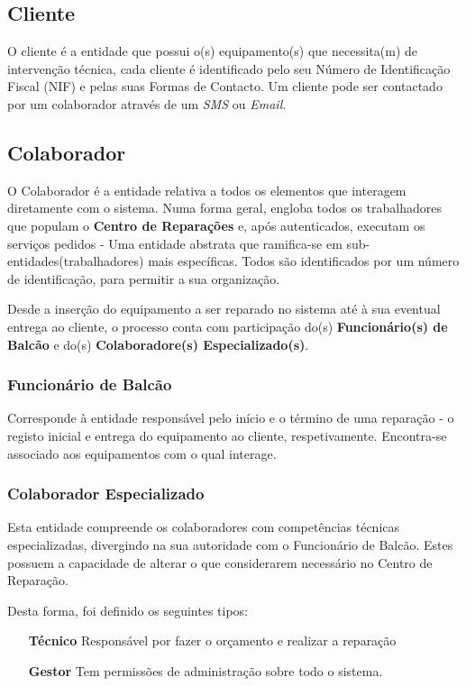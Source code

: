 \documentclass[a4paper,12pt]{scrreprt}
\begin{document}
\subsection{Cliente}\label{ent_cliente}
O cliente é a entidade que possui o(s) equipamento(s) que necessita(m) de intervenção técnica, cada cliente é identificado pelo 
seu Número de Identificação Fiscal (NIF) e pelas suas Formas de Contacto. Um cliente pode ser contactado por um colaborador através
de um \textit{SMS} ou \textit{Email}.

\subsection{Colaborador} \label{ent_colaborador}
O Colaborador é a entidade relativa a todos os elementos que interagem diretamente com o sistema. 
Numa forma geral, engloba todos os trabalhadores que populam o \textbf{Centro de Reparações} e, após autenticados, executam os
serviços pedidos - Uma entidade abstrata que ramifica-se em sub-entidades(trabalhadores) mais específicas.
Todos são identificados por um número de identificação, para permitir a sua organização.

Desde a inserção do equipamento a ser reparado no sistema até à sua eventual entrega ao cliente, o processo conta com participação
do(s) \textbf{Funcionário(s) de Balcão} e do(s) \textbf{Colaboradore(s) Especializado(s)}.

\subsubsection{Funcionário de Balcão} \label{ent_func_balcao}
Corresponde à entidade responsável pelo início e o término de uma reparação - o registo inicial e entrega do equipamento ao cliente, respetivamente.
Encontra-se associado aos equipamentos com o qual interage.

\subsubsection{Colaborador Especializado} \label{ent_colab_especializado}
Esta entidade compreende os colaboradores com competências técnicas especializadas, divergindo na sua autoridade com o Funcionário de Balcão. 
Estes possuem a capacidade de alterar o que considerarem necessário no Centro de Reparação.

Desta forma, foi definido os seguintes tipos:
\begin{itemize}
    \item[\textbf{Técnico}]{Responsável por fazer o orçamento e realizar a reparação}
    \item[\textbf{Gestor}]{Tem permissões de administração sobre todo o sistema.}
\end{itemize}
\end{document}
